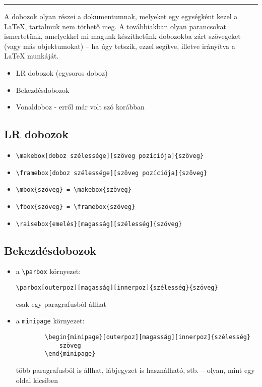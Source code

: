 \documentclass{article}
\begin{document}
\noindent\rule{\linewidth}{1pt}

A dobozok olyan részei a dokumentumnak, melyeket egy egységként kezel a \LaTeX{}, tartalmuk nem törhető meg. A továbbiakban olyan parancsokat ismertetünk, amelyekkel mi magunk készíthetünk dobozokba zárt szövegeket (vagy más objektumokat) -- ha úgy tetszik, ezzel segítve, illetve irányítva a \LaTeX{} munkáját.
\begin{itemize}
    \item LR dobozok (egysoros doboz)
    \item Bekezdésdobozok
    \item Vonaldoboz - erről már volt szó korábban
\end{itemize}

\subsection*{LR dobozok}
\begin{itemize}
    \item \verb|\makebox[doboz szélessége][szöveg pozíciója]{szöveg}|
    \item \verb|\framebox[doboz szélessége][szöveg pozíciója]{szöveg}|
    \item \verb|\mbox{szöveg} = \makebox{szöveg}|
    \item \verb|\fbox{szöveg} = \framebox{szöveg}|
    \item \verb|\raisebox{emelés}[magasság][szélesség]{szöveg}| 
\end{itemize}

\subsection*{Bekezdésdobozok}
\begin{itemize}
    \item a  \verb|\parbox| környezet:
    
     \verb|\parbox[outerpoz][magasság][innerpoz]{szélesség}{szöveg}|
    
    csak egy paragrafusból állhat
    \item a  \verb!minipage! környezet:
    \begin{verbatim}
        \begin{minipage}[outerpoz][magasság][innerpoz]{szélesség}
            szöveg
        \end{minipage}
    \end{verbatim}
    \vspace*{-2em}
    több paragrafusból is állhat, lábjegyzet is használható, stb. -- olyan, mint egy oldal kicsiben
\end{itemize}
\end{document}
